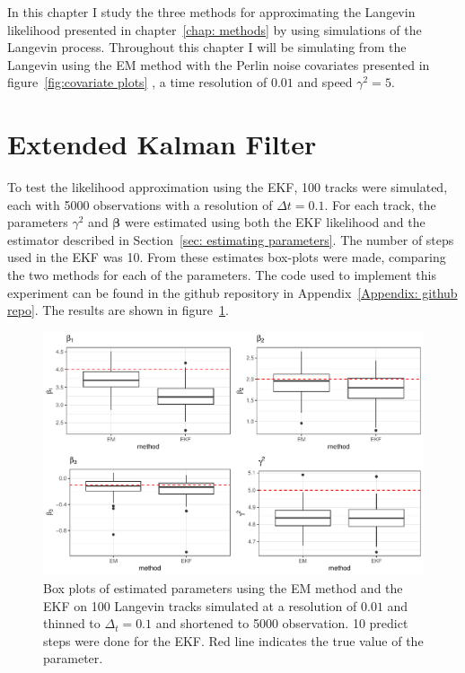 


In this chapter I study the three methods for approximating the Langevin likelihood presented in chapter~\ref{chap: methods} by using simulations of the Langevin process. Throughout this chapter I will be simulating from the Langevin using the EM method with the Perlin noise covariates presented in figure~\ref{fig:covariate plots} , a time resolution of $0.01$ and speed $\gamma^2=5$.




\section{Extended Kalman Filter}
\label{sec: EKF test}
To test the likelihood approximation using the EKF, 100 tracks were simulated, each with 5000 observations with a resolution of $\Delta t = 0.1$. For each track, the parameters $\gamma^2$ and $\bm \beta$ were estimated using both the EKF likelihood and the estimator described in Section~\ref{sec: estimating parameters}. The number of steps used in the EKF was 10. From these estimates box-plots were made, comparing the two methods for each of the parameters. The code used to implement this experiment can be found in the github repository in Appendix~\ref{Appendix: github repo}. The results are shown in figure~\ref{fig:EKF_thin_boxplot}.

 

\begin{figure}[H]
    \centering
    \includegraphics[width=\linewidth]{Images/Results/EM EKF plot.pdf}
    \caption[EM and EKF estimates]{Box plots of estimated parameters using the EM method and the EKF on 100 Langevin tracks simulated at a resolution of $0.01$ and thinned to $\Delta_t=0.1$ and shortened to 5000 observation. 10 predict steps were done for the EKF. Red line indicates the true value of the parameter.}
    \label{fig:EKF_thin_boxplot}
\end{figure}

